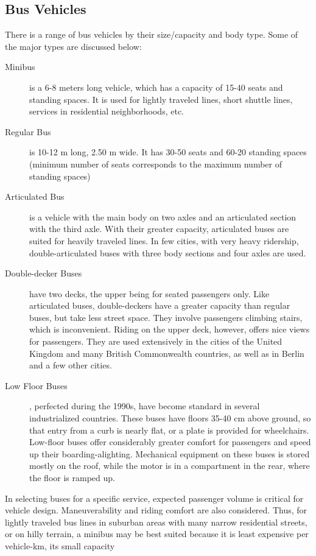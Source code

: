 \subsection{Bus Vehicles}
There is a range of bus vehicles by their size/capacity and body type. Some of the major types are discussed below:
\begin{description}
	\item [Minibus] is a 6-8 meters long vehicle, which has a capacity of 15-40 seats and standing spaces. It is used for lightly traveled lines, short shuttle lines, services in residential neighborhoods, etc.
	\item [Regular Bus]
 is 10-12 m long, 2.50 m wide. It has 30-50 seats and 60-20 standing spaces (minimum number of seats corresponds to the maximum number of standing spaces)
	\item [Articulated Bus] is a vehicle with the main body on two axles and an articulated section with the third axle. With their greater capacity, articulated buses are suited for heavily traveled lines. In few cities, with very heavy ridership, double-articulated buses with three body sections and four axles are used.
	\item [Double-decker Buses] have two decks, the upper being for seated passengers only. Like articulated buses, double-deckers have a greater capacity than regular buses, but take less street space. They involve passengers climbing stairs, which is inconvenient. Riding on the upper deck, however, offers nice views for passengers. They are used extensively in the cities of the United Kingdom and many British Commonwealth countries, as well as in Berlin and a few other cities.
	\item [Low Floor Buses], perfected during the 1990s, have become standard in several industrialized countries. These buses have floors 35-40 cm above ground, so that entry from a curb is nearly flat, or a plate is provided for wheelchairs. Low-floor buses offer considerably greater comfort for passengers and speed up their boarding-alighting. Mechanical equipment on these buses is stored mostly on the roof, while the motor is in a compartment in the rear, where the floor is ramped up.
\end{description}
In selecting buses for a specific service, expected passenger volume is critical for vehicle design. Maneuverability and riding comfort are also considered. Thus, for lightly traveled bus lines in suburban areas with many narrow residential streets, or on hilly terrain, a minibus may be best suited because it is least expensive per vehicle-km, its small capacity
